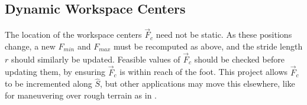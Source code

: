 \subsection{ Dynamic Workspace Centers }
The location of the workspace centers $\vec{F}_c$ need not be static. As these positions change, a new $F_{min}$ and $F_{max}$ must be recomputed as above, and the stride length $r$ should similarly be updated. Feasible values of $\vec{F}_c$ should be checked before updating them, by ensuring $\vec{F}_c$ is within reach of the foot. This project allows $\vec{F}_c$ to be incremented along $\hat{S}$, but other applications may move this elsewhere, like for maneuvering over rough terrain as in \cite{foot_placement}. 



